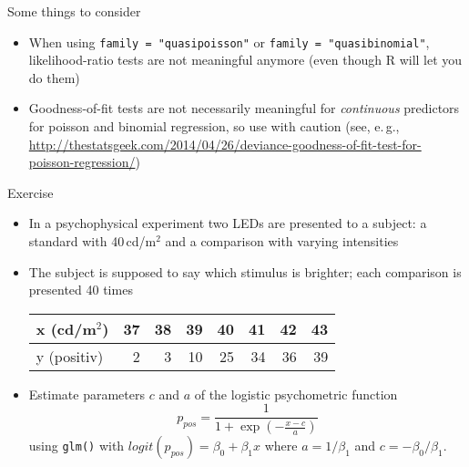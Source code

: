 \documentclass{beamer}
\begin{document}
\begin{frame}{Some things to consider}
  \begin{itemize}
    \item When using \texttt{family = "quasipoisson"} or \texttt{family =
      "quasibinomial"}, likelihood-ratio tests are not meaningful anymore
      (even though R will let you do them)
    \item Goodness-of-fit tests are not necessarily meaningful for
      \emph{continuous} predictors for poisson and binomial regression, so
      use with caution
      (see, e.\,g.,
      \url{http://thestatsgeek.com/2014/04/26/deviance-goodness-of-fit-test-for-poisson-regression/})
  \end{itemize}
\end{frame}

\begin{frame}[fragile]{}
  \begin{block}{Exercise}
    \begin{itemize}
\item In a psychophysical experiment two LEDs are presented to a
  subject: a standard with 40\,cd/m$^2$ and a comparison with varying
        intensities
    \item The subject is supposed to say which stimulus is
      brighter; each comparison is presented 40 times
        \vspace{.2cm}
\begin{center}
\begin{tabular}{l|rrrrrrr}
x (cd/m$^2$)  & 37 & 38 & 39 & 40 & 41 & 42 & 43 \\ \hline
y (positiv)   &  2 &  3 & 10 & 25 & 34 & 36 & 39
\end{tabular}
\end{center}
        \vspace{.2cm}
\item Estimate parameters $c$ and $a$ of the logistic psychometric function
\[
  p_{pos} = \frac{1}{1 +
    \exp(-\frac{\displaystyle x - c}{\displaystyle a})}
\]
using \texttt{glm()} with $logit(p_{pos}) = \beta_0 + \beta_1x$ where 
        $a = 1/\beta_1$ and $c = -\beta_0/\beta_1$.
    \end{itemize}
  \end{block}
\end{frame}
\end{document}
